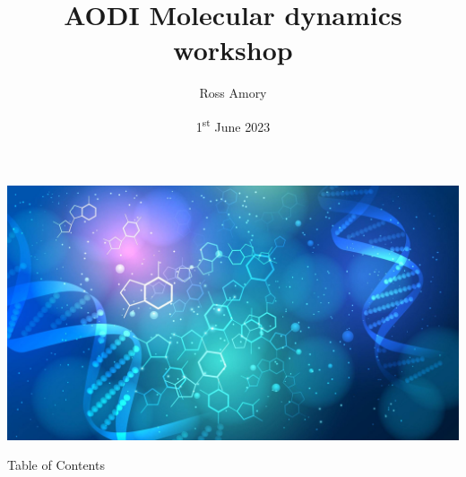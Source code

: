 

\title{AODI Molecular dynamics workshop}
\author{Ross Amory}
\date[1\textsuperscript{st} June 2023]{1\textsuperscript{st} June 2023}



{
{\includegraphics[width=\paperwidth,height=\paperheight]{figures/title_background.jpg}}
\frame{\titlepage}
}
\begin{frame}{Table of Contents}
	\begin{multicols}{2}
		\tableofcontents
	\end{multicols}
\end{frame}









